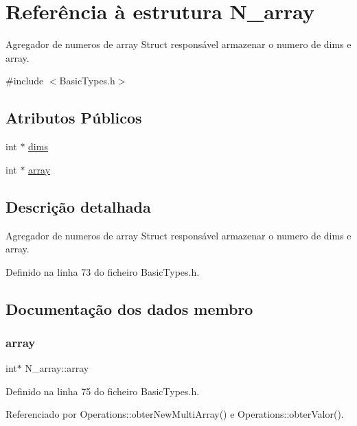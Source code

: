 \hypertarget{structN__array}{}\section{Referência à estrutura N\+\_\+array}
\label{structN__array}


Agregador de numeros de array Struct responsável armazenar o numero de dims e array.  




{\ttfamily \#include $<$Basic\+Types.\+h$>$}

\subsection*{Atributos Públicos}
\begin{DoxyCompactItemize}
\item 
int $\ast$ \hyperlink{structN__array_ac4bcc6ba8cf97045350bdfbf7d25eaa0}{dims}
\item 
int $\ast$ \hyperlink{structN__array_a86947172fed28646e92c55904ce2907c}{array}
\end{DoxyCompactItemize}


\subsection{Descrição detalhada}
Agregador de numeros de array Struct responsável armazenar o numero de dims e array. 

Definido na linha 73 do ficheiro Basic\+Types.\+h.



\subsection{Documentação dos dados membro}
\mbox{\label{structN__array_a86947172fed28646e92c55904ce2907c}} 
\subsubsection{\texorpdfstring{array}{array}}
{\footnotesize\ttfamily int$\ast$ N\+\_\+array\+::array}



Definido na linha 75 do ficheiro Basic\+Types.\+h.



Referenciado por Operations\+::obter\+New\+Multi\+Array() e Operations\+::obter\+Valor().

